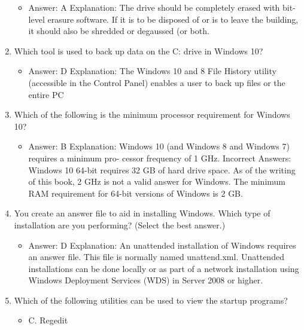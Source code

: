 \documentclass{article}
\begin{document}
\begin{enumerate}
     \begin{itemize}
         \item Answer: A
Explanation: The drive should be completely erased with bit-level erasure software.
If it is to be disposed of or is to leave the building, it should also be shredded or
degaussed (or both.
     \end{itemize}
     \item Which tool is used to back up data on the C: drive in Windows 10?
     \begin{itemize}
         \item Answer: D
Explanation: The Windows 10 and 8 File History utility (accessible in the Control
Panel) enables a user to back up files or the entire PC
     \end{itemize}
     \item Which of the following is the minimum processor requirement for
Windows 10?
     \begin{itemize}
         \item Answer: B
Explanation: Windows 10 (and Windows 8 and Windows 7) requires a minimum pro-
cessor frequency of 1 GHz.
Incorrect Answers: Windows 10 64-bit requires 32 GB of hard drive space. As of the
writing of this book, 2 GHz is not a valid answer for Windows. The minimum RAM
requirement for 64-bit versions of Windows is 2 GB.
     \end{itemize}
     \item You create an answer file to aid in installing Windows. Which type
of installation are you performing? (Select the best answer.)
     \begin{itemize}
         \item Answer: D
Explanation: An unattended installation of Windows requires an answer file. This file is
normally named unattend.xml. Unattended installations can be done locally or as part
of a network installation using Windows Deployment Services (WDS) in Server 2008 or
higher.
     \end{itemize}
     \item Which of the following utilities can be used to view the startup
programs?
     \begin{itemize}
         \item C. Regedit
     \end{itemize}
     
\end{enumerate}
\end{document}
